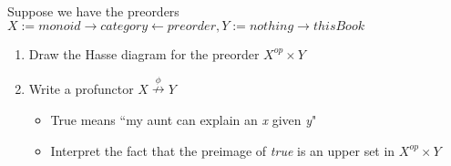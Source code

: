 
Suppose we have the preorders $X:=\boxed{monoid\rightarrow category \leftarrow preorder}, Y:=\boxed{nothing \rightarrow thisBook}$
    \begin{enumerate}
      \item Draw the Hasse diagram for the preorder $X^{op} \times Y$
      \item Write a profunctor $X \overset{\phi}\nrightarrow Y$
            \begin{itemize}
              \item True means ``my aunt can explain an \emph{x} given \emph{y}"
              \item Interpret the fact that the preimage of \emph{true} is an upper set in $X^{op}\times Y$
            \end{itemize}
    \end{enumerate}